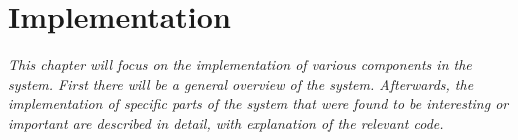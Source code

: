 \chapter{Implementation}
\label{cha:implementation}

\textit{This chapter will focus on the implementation of various components in the system. First there will be a general overview of the system. Afterwards, the implementation of specific parts of the system that were found to be interesting or important are described in detail, with explanation of the relevant code.} \newpage





